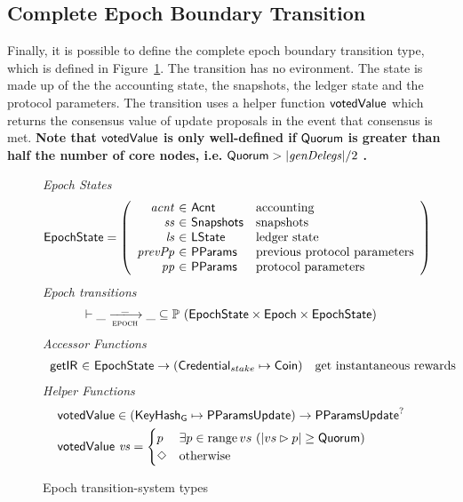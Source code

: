 \clearpage

\subsection{Complete Epoch Boundary Transition}
\label{sec:total-epoch}

Finally, it is possible to define the complete epoch boundary transition type,
which is defined in Figure~\ref{fig:ts-types:epoch}.
The transition has no evironment.
The state is made up of the the accounting state, the snapshots, the ledger state and the
protocol parameters.
The transition uses a helper function $\mathsf{votedValue}$ which returns
the consensus value of update proposals in the event that consensus is met.
\textbf{Note that} $\mathsf{votedValue}$
\textbf{is only well-defined if } $\mathsf{Quorum}$
\textbf{is greater than half the number of core nodes, i.e.}
$\mathsf{Quorum} > |\mathit{genDelegs}|/2$ \textbf{.}

\begin{figure}[htb]
  \emph{Epoch States}
  \begin{equation*}
    \EpochState =
    \left(
      \begin{array}{r@{~\in~}ll}
        \var{acnt} & \Acnt & \text{accounting}\\
        \var{ss} & \Snapshots & \text{snapshots}\\
        \var{ls} & \LState & \text{ledger state}\\
        \var{prevPp} & \PParams & \text{previous protocol parameters}\\
        \var{pp} & \PParams & \text{protocol parameters}\\
      \end{array}
    \right)
  \end{equation*}
  \emph{Epoch transitions}
  \begin{equation*}
    \vdash
    \var{\_} \trans{epoch}{\_} \var{\_}
    \subseteq \powerset (\EpochState \times \Epoch \times \EpochState)
  \end{equation*}
  \emph{Accessor Functions}
  \begin{equation*}
    \begin{array}{r@{~\in~}lr}
      \fun{getIR} & \EpochState \to (\StakeCredential \mapsto \Coin)
                  & \text{get instantaneous rewards} \\
    \end{array}
  \end{equation*}
  \emph{Helper Functions}
  \begin{align*}
      & \mathsf{votedValue} \in (\mathsf{KeyHash_G}\mapsto\mathsf{PParamsUpdate}) \to \mathsf{PParamsUpdate}^?\\
      & \mathsf{votedValue}~\mathit{vs} =
        \begin{cases}
          p & \exists p\in\operatorname{range}{vs}~(|vs\rhd p|\geq \mathsf{Quorum}) \\
          \Diamond & \text{otherwise} \\
        \end{cases}
  \end{align*}
  \caption{Epoch transition-system types}
  \label{fig:ts-types:epoch}
\end{figure}


